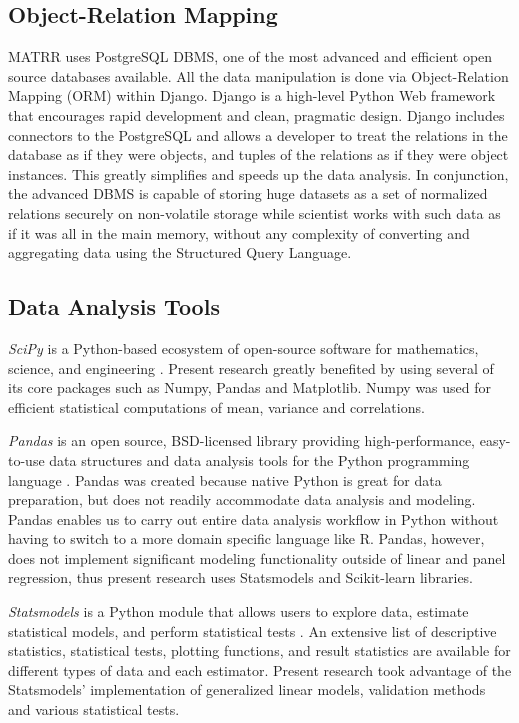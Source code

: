 	\subsection{Object-Relation Mapping}
	MATRR uses PostgreSQL DBMS, one of the most advanced and efficient open source databases available. All the data manipulation is done via Object-Relation Mapping (ORM) within Django. Django is a high-level Python Web framework that encourages rapid development and clean, pragmatic design. Django includes connectors to the PostgreSQL and allows a developer to treat the relations in the database as if they were objects, and tuples of the relations as if they were object instances. This greatly simplifies and speeds up the data analysis. In conjunction, the advanced DBMS is capable of storing huge datasets as a set of normalized relations securely on non-volatile storage while scientist works with such data as if it was all in the main memory, without any complexity of converting and aggregating data using the Structured Query Language.  
	
	
	\subsection{Data Analysis Tools}	
	\textit{SciPy} is a Python-based ecosystem of open-source software for mathematics, science, and engineering . Present research greatly benefited by using several of its core packages such as Numpy, Pandas and Matplotlib. Numpy was used for efficient statistical computations of mean, variance and correlations.
	
	\textit{Pandas} is an open source, BSD-licensed library providing high-performance, easy-to-use data structures and data analysis tools for the Python programming language . Pandas was created because native Python is great for data preparation, but does not readily accommodate data analysis and modeling. Pandas enables us to carry out entire data analysis workflow in Python without having to switch to a more domain specific language like R. Pandas, however, does not implement significant modeling functionality outside of linear and panel regression, thus present research uses Statsmodels and Scikit-learn libraries.
	
	\textit{Statsmodels} is a Python module that allows users to explore data, estimate statistical models, and perform statistical tests . An extensive list of descriptive statistics, statistical tests, plotting functions, and result statistics are available for different types of data and each estimator. Present research took advantage of the Statsmodels' implementation of generalized linear models, validation methods and various statistical tests. 
	
